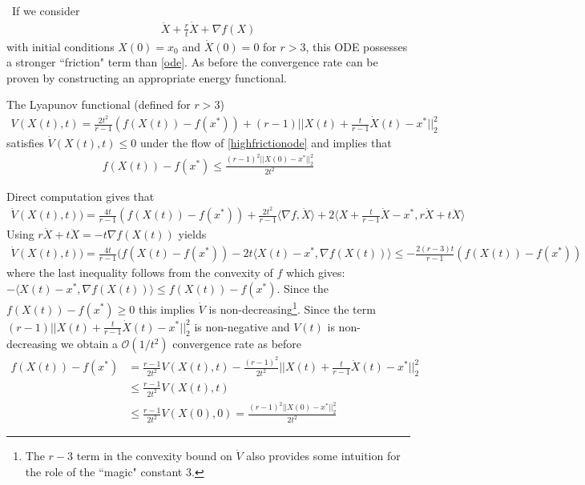 \
If we consider
\begin{align}
    \ddot{X} + \frac{r}{t} \dot{X} + \nabla f(X) \label{highfrictionode}
\end{align}
with initial conditions $X(0) = x_0$ and $\dot{X}(0) = 0$ for $r>3$, this ODE possesses a stronger ``friction" term than \eqref{ode}. As before the convergence rate can be proven by constructing an appropriate energy functional.
\begin{theorem}
The Lyapunov functional (defined for $r>3$)
\begin{align}
\label{agdode}
    V(X(t), t) = \frac{2t^2}{r-1} \left( f(X(t)) -f(x^*) \right) + (r-1) ||X(t) + \frac{t}{r-1}\dot{X}(t) -x^*||_2^2
\end{align}
satisfies $\dot{V}(X(t), t) \leq 0$ under the flow of \eqref{highfrictionode} and implies that
\begin{align*}
    f(X(t)) - f(x^*) \leq \frac{(r-1)^2 ||X(0)-x^*||_2^2}{2 t^2}
\end{align*}
\end{theorem}
\proofstart
Direct computation gives that
\begin{align*}
    \dot{V}(X(t), t)) = \frac{4t}{r-1}(f(X(t)) - f(x^*)) + \frac{2t^2}{r-1} \langle \nabla f, \dot{X} \rangle + 2 \langle X + \frac{t}{r-1} \dot{X} - x^*, r \dot{X} + t \ddot{X} \rangle
\end{align*}
Using $r\dot{X} + t \ddot{X} = -t \nabla f(X(t))$ yields
\begin{align*}
    \dot{V}(X(t), t)) = \frac{4t}{r-1} (f(X(t) - f(x^*)) - 2t \langle X(t) - x^*, \nabla f(X(t)) \rangle \leq - \frac{2(r-3)t}{r-1}(f(X(t))-f(x^*))
\end{align*}
where the last inequality follows from the convexity of $f$ which gives: $-\langle X(t) - x^*, \nabla f(X(t)) \rangle \leq f(X(t)) - f(x^*)$. Since the $f(X(t)) - f(x^*) \geq 0$ this implies $\dot{V}$ is non-decreasing\footnote{The $r-3$ term in the convexity bound on $\dot{V}$ also provides some intuition for the role of the ``magic" constant $3$.}. Since the term $(r-1) ||X(t) + \frac{t}{r-1} \dot{X}(t) - x^*||_2^2$ is non-negative and $V(t)$ is non-decreasing we obtain a $\mathcal{O}(1/t^2)$ convergence rate as before
\begin{align*}
    f(X(t)) - f(x^*) &= \frac{r-1}{2t^2} V(X(t), t) - \frac{(r-1)^2}{2t^2} ||X(t) + \frac{t}{r-1} \dot{X}(t) - x^*||_2^2 \\
    &\leq \frac{r-1}{2t^2} V(X(t), t) \\
    &\leq \frac{r-1}{2t^2} V(X(0), 0) = \frac{(r-1)^2 ||X(0)-x^*||_2^2}{2 t^2}
\end{align*}
\proofend

